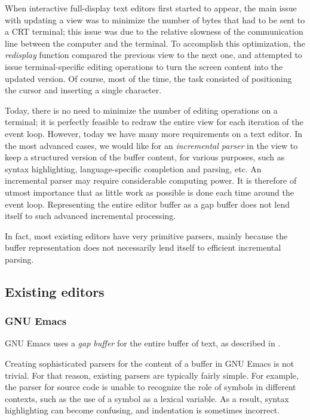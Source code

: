 When interactive full-display text editors first started to appear,
the main issue with updating a view was to minimize the number of
bytes that had to be sent to a CRT terminal; this issue was due to the
relative slowness of the communication line between the computer and
the terminal.  To accomplish this optimization, the \emph{redisplay}
function compared the previous view to the next one, and attempted to
issue terminal-specific editing operations to turn the screen content
into the updated version.  Of course, most of the time, the task
consisted of positioning the cursor and inserting a single character.

Today, there is no need to minimize the number of editing operations
on a terminal; it is perfectly feasible to redraw the entire view for
each iteration of the event loop.  However, today we have many more
requirements on a text editor.  In the most advanced cases, we would
like for an \emph{incremental parser} in the view to keep a structured
version of the buffer content, for various purposes, such as syntax
highlighting, language-specific completion and parsing, etc.  An
incremental parser may require considerable computing power.  It is
therefore of utmost importance that as little work as possible is done
each time around the event loop.  Representing the entire editor
buffer as a gap buffer does not lend itself to such advanced
incremental processing.

In fact, most existing editors have very primitive parsers, mainly
because the buffer representation does not necessarily lend itself to
efficient incremental parsing.

\subsection{Existing editors}

\subsubsection{GNU Emacs}

GNU Emacs \cite{CraftOfTextEditiing,GNUEmacsLispReferenceManual} uses
a \emph{gap buffer} for the entire buffer of text, as described in
.

Creating sophisticated parsers for the content of a buffer in GNU
Emacs is not trivial.  For that reason, existing parsers are typically
fairly simple.  For example, the parser for \commonlisp{} source code
is unable to recognize the role of symbols in different contexts, such
as the use of a \commonlisp{} symbol as a lexical variable.  As a
result, syntax highlighting can become confusing, and indentation is
sometimes incorrect.

